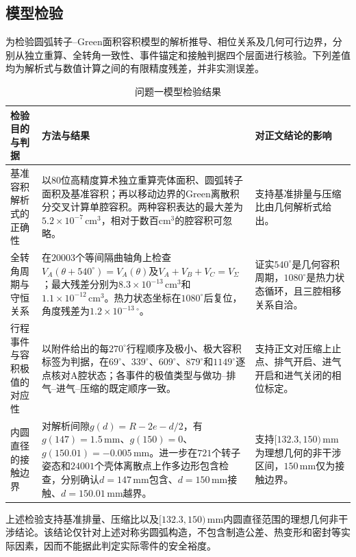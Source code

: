 \documentclass[withoutpreface,bwprint]{cumcmthesis}
\begin{document}
\subsection{模型检验}

为检验圆弧转子--Green面积容积模型的解析推导、相位关系及几何可行边界，分别从独立重算、全转角一致性、事件锚定和接触判据四个层面进行核验。下列差值均为解析式与数值计算之间的有限精度残差，并非实测误差。

\begin{table}[H]
\centering
\small
\caption{问题一模型检验结果}
\label{tab:q1-verification}
\begin{tabular}{p{}p{}p{}}
\toprule
检验目的与判据 & 方法与结果 & 对正文结论的影响\\
\midrule
基准容积解析式的正确性 & 以80位高精度算术独立重算壳体面积、圆弧转子面积及基准容积；再以移动边界的Green离散积分交叉计算单腔容积。两种容积表达的最大差为$5.2\times10^{-7}\,\mathrm{cm^3}$，相对于数百$\mathrm{cm^3}$的腔容积可忽略。 & 支持基准排量与压缩比由几何解析式给出。\\
全转角周期与守恒关系 & 在$20003$个等间隔曲轴角上检查$V_A(\theta+540^\circ)=V_A(\theta)$及$V_A+V_B+V_C=V_{\Sigma}$；最大残差分别为$8.3\times10^{-13}\,\mathrm{cm^3}$和$1.1\times10^{-12}\,\mathrm{cm^3}$。热力状态坐标在$1080^\circ$后复位，角度残差为$1.2\times10^{-13}\,^\circ$。 & 证实$540^\circ$是几何容积周期，$1080^\circ$是热力状态循环，且三腔相移关系自洽。\\
行程事件与容积极值的对应性 & 以附件给出的每$270^\circ$行程顺序及极小、极大容积标签为判据，在$69^\circ$、$339^\circ$、$609^\circ$、$879^\circ$和$1149^\circ$逐点核对A腔状态；各事件的极值类型与做功--排气--进气--压缩的既定顺序一致。 & 支持正文对压缩上止点、排气开启、进气开启和进气关闭的相位标定。\\
内圆直径的接触边界 & 对解析间隙$g(d)=R-2e-d/2$，有$g(147)=1.5\,\mathrm{mm}$、$g(150)=0$、$g(150.01)=-0.005\,\mathrm{mm}$。进一步在$721$个转子姿态和$24001$个壳体离散点上作多边形包含检查，分别确认$d=147\,\mathrm{mm}$包含、$d=150\,\mathrm{mm}$接触、$d=150.01\,\mathrm{mm}$越界。 & 支持$[132.3,150)\,\mathrm{mm}$为理想几何的非干涉区间，$150\,\mathrm{mm}$仅为接触边界。\\
\bottomrule
\end{tabular}
\end{table}

上述检验支持基准排量、压缩比以及$[132.3,150)\,\mathrm{mm}$内圆直径范围的理想几何非干涉结论。该结论仅针对上述对称劣圆弧构造，不包含制造公差、热变形和密封等实际因素，因而不能据此判定实际零件的安全裕度。
\end{document}
